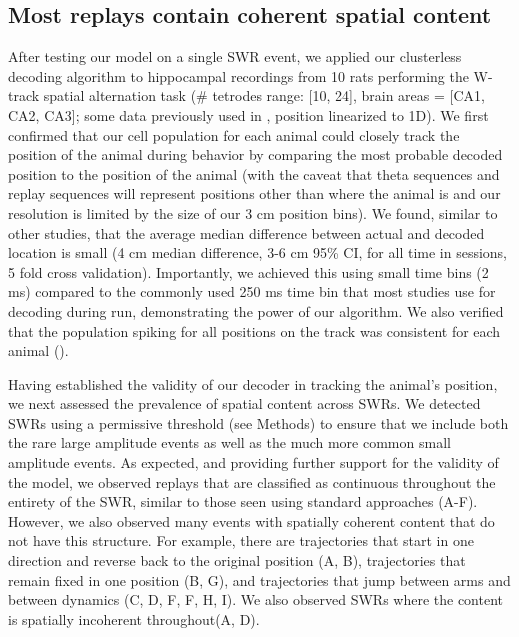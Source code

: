 \documentclass[9pt,lineno]{elife}
\begin{document}
\subsection*{Most replays contain coherent spatial content}

After testing our model on a single SWR event, we applied our clusterless decoding algorithm to hippocampal recordings from 10 rats performing the W-track spatial alternation task (\# tetrodes range: [10, 24], brain areas = [CA1, CA2, CA3]; some data previously used in \cite{KarlssonAwakereplayremote2009, KayConstantSubsecondCycling2020, CarrTransientSlowGamma2012}, position linearized to 1D). We first confirmed that our cell population for each animal could closely track the position of the animal during behavior by comparing the most probable decoded position to the position of the animal (with the caveat that theta sequences and replay sequences will represent positions other than where the animal is and our resolution is limited by the size of our 3 cm position bins). We found, similar to other studies, that the average median difference between actual and decoded location is small (4 cm median difference, 3-6 cm 95\% CI, for all time in sessions, 5 fold cross validation). Importantly, we achieved this using small time bins (2 ms) compared to the commonly used 250 ms time bin that most studies use for decoding during run, demonstrating the power of our algorithm. We also verified that the population spiking for all positions on the track was consistent for each animal ().

Having established the validity of our decoder in tracking the animal's position, we next assessed the prevalence of spatial content across SWRs. We detected SWRs using a permissive threshold (see Methods) to ensure that we include both the rare large amplitude events as well as the much more common small amplitude events. As expected, and providing further support for the validity of the model, we observed replays that are classified as continuous throughout the entirety of the SWR, similar to those seen using standard approaches (A-F). However, we also observed many events with spatially coherent content that do not have this structure. For example, there are trajectories that start in one direction and reverse back to the original position (A, B), trajectories that remain fixed in one position (B, G), and trajectories that jump between arms and between dynamics (C, D, F, F, H, I). We also observed SWRs where the content is spatially incoherent throughout(A, D).
\end{document}
